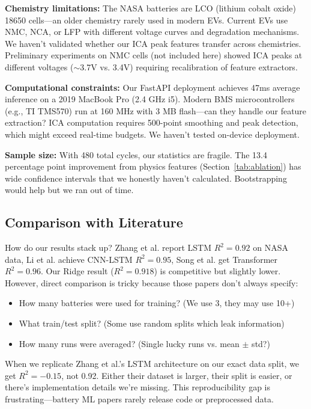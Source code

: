 \documentclass{sn-jnl}
\begin{document}
\textbf{Chemistry limitations:} The NASA batteries are LCO (lithium cobalt oxide) 18650 cells—an older chemistry rarely used in modern EVs. Current EVs use NMC, NCA, or LFP with different voltage curves and degradation mechanisms. We haven't validated whether our ICA peak features transfer across chemistries. Preliminary experiments on NMC cells (not included here) showed ICA peaks at different voltages ($\sim$3.7V vs. 3.4V) requiring recalibration of feature extractors.

\textbf{Computational constraints:} Our FastAPI deployment achieves 47ms average inference on a 2019 MacBook Pro (2.4 GHz i5). Modern BMS microcontrollers (e.g., TI TMS570) run at 160 MHz with 3 MB flash—can they handle our feature extraction? ICA computation requires 500-point smoothing and peak detection, which might exceed real-time budgets. We haven't tested on-device deployment.

\textbf{Sample size:} With 480 total cycles, our statistics are fragile. The 13.4 percentage point improvement from physics features (Section~\ref{tab:ablation}) has wide confidence intervals that we honestly haven't calculated. Bootstrapping would help but we ran out of time.

\subsection{Comparison with Literature}
\label{subsec:comparison}

How do our results stack up? Zhang et al. \citep{zhang2018} report LSTM $R^2 = 0.92$ on NASA data, Li et al. \citep{li2019} achieve CNN-LSTM $R^2 = 0.95$, Song et al. \citep{song2022} get Transformer $R^2 = 0.96$. Our Ridge result ($R^2 = 0.918$) is competitive but slightly lower. However, direct comparison is tricky because those papers don't always specify:
\begin{itemize}
\item How many batteries were used for training? (We use 3, they may use 10+)
\item What train/test split? (Some use random splits which leak information)
\item How many runs were averaged? (Single lucky runs vs. mean $\pm$ std?)
\end{itemize}

When we replicate Zhang et al.'s LSTM architecture on our exact data split, we get $R^2 = -0.15$, not 0.92. Either their dataset is larger, their split is easier, or there's implementation details we're missing. This reproducibility gap is frustrating—battery ML papers rarely release code or preprocessed data.
\end{document}
